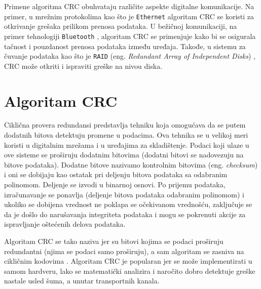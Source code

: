 \documentclass[12pt,oneside]{memoir}
\begin{document}
Primene algoritma CRC obuhvataju različite aspekte digitalne komunikacije. Na primer, u mrežnim protokolima kao što je \texttt{Ethernet} \cite{ethernet_protocol} algoritam CRC se koristi za otkrivanje grešaka prilikom prenosa podataka. U bežičnoj komunikaciji, na primer tehnologiji \texttt{Bluetooth} \cite{bluetooth}, algoritam CRC se primenjuje kako bi se osigurala tačnost i pouzdanost prenosa podataka između uređaja. Takođe, u sistemu za čuvanje podataka kao što je \texttt{RAID} (eng. \textit{Redundant Array of Independent Disks}) \cite{raid}, CRC može 
otkriti i ispraviti greške na nivou diska.

\section{Algoritam CRC}

Ciklična provera redundansi predstavlja tehniku koja omogućava da se putem dodatnih bitova detektuju promene u podacima. Ova tehnika se u velikoj meri koristi u digitalnim mrežama i u uređajima za skladištenje. Podaci koji ulaze u ove sisteme se proširuju dodatnim bitovima (dodatni bitovi se nadovezuju na bitove podataka). Dodatne bitove nazivamo kontrolnim bitovima (eng. \textit{checksum}) i oni se dobijaju kao ostatak pri deljenju bitova podataka sa odabranim polinomom. Deljenje se izvodi u binarnoj osnovi. Po prijemu podataka, izračunavanje se ponavlja (deljenje bitova podataka odabranim polinomom) i ukoliko se dobijena vrednost ne poklapa se očekivanom vrednošću, zaključuje se da je došlo do narušavanja integriteta podataka i mogu se pokrenuti akcije za ispravljanje oštećenih delova podataka. %

Algoritam CRC se tako naziva jer su bitovi kojima se podaci proširuju redundantni (njima se podaci samo proširuju), a sam algoritam se zasniva na cikličnim kodovima \cite{cyclic_codes}. Algoritam CRC je popularan jer se može implementirati u samom hardveru, lako se matematički analizira i naročito dobro detektuje greške nastale usled šuma, a unutar transportnih kanala. %

\end{document}
